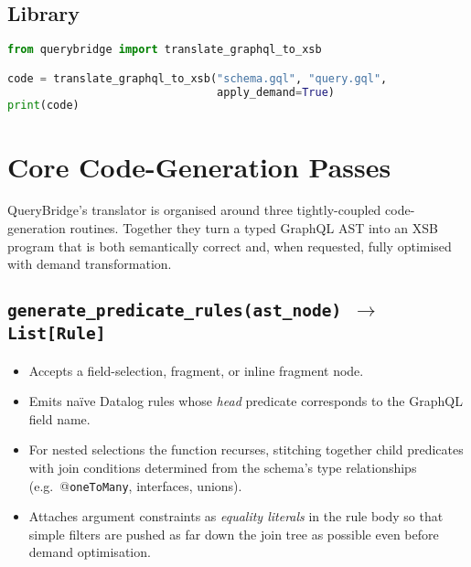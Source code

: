 \documentclass[11pt]{article}
\begin{document}
\subsection{Library}
\begin{lstlisting}[language=Python]
from querybridge import translate_graphql_to_xsb

code = translate_graphql_to_xsb("schema.gql", "query.gql",
                                apply_demand=True)
print(code)
\end{lstlisting}

\section{Core Code-Generation Passes}
\label{sec:codegen}

QueryBridge’s translator is organised around three tightly-coupled
code-generation routines.  Together they turn a typed GraphQL AST into an
XSB program that is both semantically correct and, when requested, fully
optimised with demand transformation.

\subsection{\texttt{generate\_predicate\_rules(ast\_node) $\rightarrow$ List\texttt{[}Rule\texttt{]}}}
\begin{itemize}[leftmargin=1.5em]
  \item Accepts a field-selection, fragment, or inline fragment node.
  \item Emits naïve Datalog rules whose \emph{head} predicate corresponds
        to the GraphQL field name.  
  \item For nested selections the function recurses, stitching together
        child predicates with join conditions determined from the schema’s
        type relationships (e.g.\ @\texttt{oneToMany}, interfaces,
        unions).
  \item Attaches argument constraints as \emph{equality literals} in the
        rule body so that simple filters are pushed as far down the join
        tree as possible even before demand optimisation.
\end{itemize}
\end{document}
